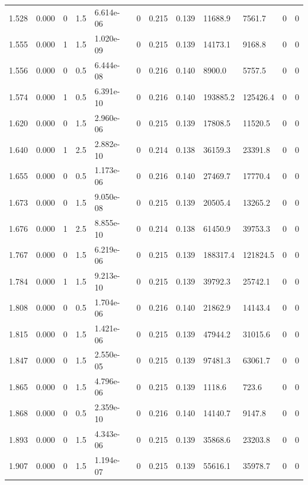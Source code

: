 \documentclass[preview]{standalone}
\begin{document}
{{{\begin{tabular}{L{1.2cm}C{1.2cm} C{0.3cm}C{0.5cm} C{1.4cm}C{1.4cm} C{1.4cm}C{1.4cm} C{1.6cm}C{1.6cm} C{1.6cm}C{1.6cm}}
  1.528  &  0.000  & 0     & 1.5 &  6.614e-06  & 0  &  0.215&   0.139& 11688.9 & 7561.7   &  0 & 0  \\ 
  1.555  &  0.000  & 1     & 1.5 &  1.020e-09  & 0  &  0.215&   0.139& 14173.1 & 9168.8   &  0 & 0  \\ 
  1.556  &  0.000  & 0     & 0.5 &  6.444e-08  & 0  &  0.216&   0.140& 8900.0 & 5757.5   &  0 & 0  \\ 
  1.574  &  0.000  & 1     & 0.5 &  6.391e-10  & 0  &  0.216&   0.140& 193885.2 & 125426.4   &  0 & 0  \\ 
  1.620  &  0.000  & 0     & 1.5 &  2.960e-06  & 0  &  0.215&   0.139& 17808.5 & 11520.5   &  0 & 0  \\ 
  1.640  &  0.000  & 1     & 2.5 &  2.882e-10  & 0  &  0.214&   0.138& 36159.3 & 23391.8   &  0 & 0  \\ 
  1.655  &  0.000  & 0     & 0.5 &  1.173e-06  & 0  &  0.216&   0.140& 27469.7 & 17770.4   &  0 & 0  \\ 
  1.673  &  0.000  & 0     & 1.5 &  9.050e-08  & 0  &  0.215&   0.139& 20505.4 & 13265.2   &  0 & 0  \\ 
  1.676  &  0.000  & 1     & 2.5 &  8.855e-10  & 0  &  0.214&   0.138& 61450.9 & 39753.3   &  0 & 0  \\ 
  1.767  &  0.000  & 0     & 1.5 &  6.219e-06  & 0  &  0.215&   0.139& 188317.4 & 121824.5   &  0 & 0  \\ 
  1.784  &  0.000  & 1     & 1.5 &  9.213e-10  & 0  &  0.215&   0.139& 39792.3 & 25742.1   &  0 & 0  \\ 
  1.808  &  0.000  & 0     & 0.5 &  1.704e-06  & 0  &  0.216&   0.140& 21862.9 & 14143.4   &  0 & 0  \\ 
  1.815  &  0.000  & 0     & 1.5 &  1.421e-06  & 0  &  0.215&   0.139& 47944.2 & 31015.6   &  0 & 0  \\ 
  1.847  &  0.000  & 0     & 1.5 &  2.550e-05  & 0  &  0.215&   0.139& 97481.3 & 63061.7   &  0 & 0  \\ 
  1.865  &  0.000  & 0     & 1.5 &  4.796e-06  & 0  &  0.215&   0.139& 1118.6 & 723.6   &  0 & 0  \\ 
  1.868  &  0.000  & 0     & 0.5 &  2.359e-10  & 0  &  0.216&   0.140& 14140.7 & 9147.8   &  0 & 0  \\ 
  1.893  &  0.000  & 0     & 1.5 &  4.343e-06  & 0  &  0.215&   0.139& 35868.6 & 23203.8   &  0 & 0  \\ 
  1.907  &  0.000  & 0     & 1.5 &  1.194e-07  & 0  &  0.215&   0.139& 55616.1 & 35978.7   &  0 & 0  \\ 

\end{tabular}}}}
\end{document}
